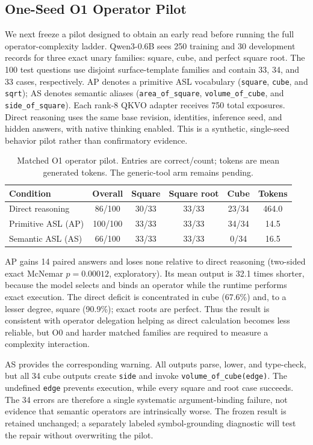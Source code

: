 \documentclass[11pt]{article}
\begin{document}
\subsection{One-Seed O1 Operator Pilot}

We next freeze a pilot designed to obtain an early read before running the full
operator-complexity ladder. Qwen3-0.6B sees 250 training and 30 development
records for three exact unary families: square, cube, and perfect square root.
The 100 test questions use disjoint surface-template families and contain 33,
34, and 33 cases, respectively. AP denotes a primitive ASL vocabulary
(\texttt{square}, \texttt{cube}, and \texttt{sqrt}); AS denotes semantic
aliases (\texttt{area\_of\_square}, \texttt{volume\_of\_cube}, and
\texttt{side\_of\_square}). Each rank-8 QKVO adapter receives 750 total
exposures. Direct reasoning uses the same base revision, identities, inference
seed, and hidden answers, with native thinking enabled. This is a synthetic,
single-seed behavior pilot rather than confirmatory evidence.

\begin{table}[t]
\centering
\small
\caption{Matched O1 operator pilot. Entries are correct/count; tokens are mean
generated tokens. The generic-tool arm remains pending.}
\label{tab:operator-o1-pilot}
\begin{tabular}{@{}lccccc@{}}
\toprule
Condition & Overall & Square & Square root & Cube & Tokens \\
\midrule
Direct reasoning & 86/100 & 30/33 & 33/33 & 23/34 & 464.0 \\
Primitive ASL (AP) & 100/100 & 33/33 & 33/33 & 34/34 & 14.5 \\
Semantic ASL (AS) & 66/100 & 33/33 & 33/33 & 0/34 & 16.5 \\
\bottomrule
\end{tabular}
\end{table}

AP gains 14 paired answers and loses none relative to direct reasoning
(two-sided exact McNemar $p=0.00012$, exploratory). Its mean output is 32.1
times shorter, because the model selects and binds an operator while the runtime
performs exact execution. The direct deficit is concentrated in cube (67.6\%)
and, to a lesser degree, square (90.9\%); exact roots are perfect. Thus the
result is consistent with operator delegation helping as direct calculation
becomes less reliable, but O0 and harder matched families are required to
measure a complexity interaction.

AS provides the corresponding warning. All outputs parse, lower, and type-check,
but all 34 cube outputs create \texttt{side} and invoke
\texttt{volume\_of\_cube(edge)}. The undefined \texttt{edge} prevents execution,
while every square and root case succeeds. The 34 errors are therefore a single
systematic argument-binding failure, not evidence that semantic operators are
intrinsically worse. The frozen result is retained unchanged; a separately
labeled symbol-grounding diagnostic will test the repair without overwriting the
pilot.
\end{document}
